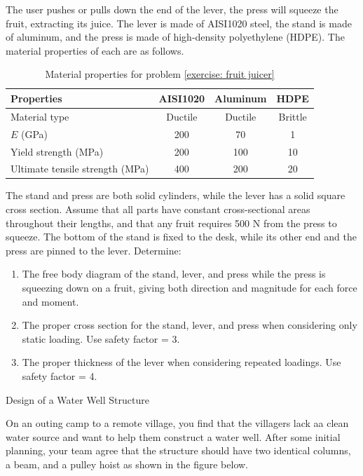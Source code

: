 \documentclass[
10pt,
a4paper,
openany,
svgnames,
]{book}
\newcommand{\exercise}{%
\item \label{lab:\arabic{chapter}.\arabic{exercisesi}}  %
}
\begin{document}
\begin{exercises}
  The user pushes or pulls down the end of the lever, the press will squeeze the fruit, extracting its juice. The lever is made of AISI1020 steel, the stand is made of aluminum, and the press is made of high-density polyethylene (HDPE). The material properties of each are as follows.
  
  \begin{table}
    \centering
    \caption{Material properties for problem \ref{exercise: fruit juicer}}
    \begin{tabular}{ lccc }
      \toprule
      Properties & AISI1020 & Aluminum & HDPE \\
      \midrule
      Material type & Ductile & Ductile & Brittle \\
      $E$ (GPa) & 200 & 70 & 1 \\
      Yield strength (MPa) & 200 & 100 & 10 \\
      Ultimate tensile strength (MPa) & 400 & 200 & 20 \\
      \bottomrule
    \end{tabular}
  \end{table}
  
  The stand and press are both solid cylinders, while the lever has a solid square cross section. Assume that all parts have constant cross-sectional areas throughout their lengths, and that any fruit requires 500 N from the press to squeeze. The bottom of the stand is fixed to the desk, while its other end and the press are pinned to the lever.
  Determine:
  \begin{enumerate}
  \item The free body diagram of the stand, lever, and press while the press is squeezing down on a fruit, giving both direction and magnitude for each force and moment.
  \item The proper cross section for the stand, lever, and press when considering only static loading. Use safety factor = 3.
  \item The proper thickness of the lever when considering repeated loadings. Use safety factor = 4.
  \end{enumerate}

  \exercise Design of a Water Well Structure

  On an outing camp to a remote village, you find that the villagers lack aa  clean water source and want to help them construct a water well. After some initial planning, your team agree that the structure should have two identical columns, a beam, and a pulley hoist as shown in the figure below.


\end{exercises}
\end{document}

